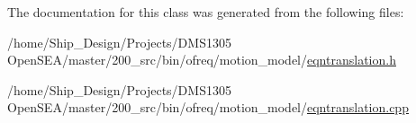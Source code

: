 The documentation for this class was generated from the following files\-:\begin{DoxyCompactItemize}
\item 
/home/\-Ship\-\_\-\-Design/\-Projects/\-D\-M\-S1305 Open\-S\-E\-A/master/200\-\_\-src/bin/ofreq/motion\-\_\-model/\hyperlink{eqntranslation_8h}{eqntranslation.\-h}\item 
/home/\-Ship\-\_\-\-Design/\-Projects/\-D\-M\-S1305 Open\-S\-E\-A/master/200\-\_\-src/bin/ofreq/motion\-\_\-model/\hyperlink{eqntranslation_8cpp}{eqntranslation.\-cpp}\end{DoxyCompactItemize}
